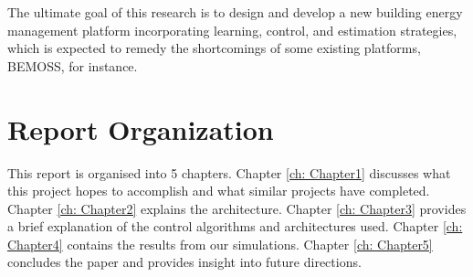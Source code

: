 The ultimate goal of this research is to design and develop a new building energy management
platform incorporating learning, control, and estimation strategies, which is expected to remedy the
shortcomings of some existing platforms, BEMOSS, for instance.

\section{Report Organization}
This report is organised into 5 chapters.  Chapter \ref{ch: Chapter1} discusses what this project hopes to accomplish and what similar projects have completed. Chapter \ref{ch: Chapter2} explains the architecture. Chapter \ref{ch: Chapter3} provides a brief explanation of the control algorithms and architectures used. Chapter \ref{ch: Chapter4} contains the results from our simulations. Chapter \ref{ch: Chapter5} concludes the paper and provides insight into future directions.

